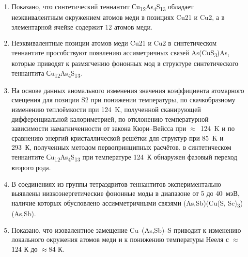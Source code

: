 \begin{enumerate}
\item Показано, что синтетический теннантит Сu\textsubscript{12}As\textsubscript{4}S\textsubscript{13} обладает неэквивалентным  окружением атомов меди в позициях Cu21 и Cu2, а в элементарной ячейке содержит 12 атомов меди.
\item Неэквивалентные позиции атомов меди Cu21 и Cu2 в синтетическом теннантите прособствуют появлению ассиметричных связей As(CuS\textsubscript{3})As, которые приводят к размягчению фононных мод в структуре синтетического теннантита Сu\textsubscript{12}As\textsubscript{4}S\textsubscript{13}.
\item На основе данных аномального изменения значения коэффициента атомарного смещения для позиции S2 при понижении температуры, по скачкобразному изменению теплоёмкости при 124~K, полученной сканирующей дифференциальной калориметрией, по отклонению температурной зависимости намагниченности от закона Кюри--Вейсса при $\approx$~124~K и по сравнению энергий кристаллической решётки для структур при 85~K и 293~К, полученных методом первопринципных расчётов, в синтетическом теннантите Сu\textsubscript{12}As\textsubscript{4}S\textsubscript{13} при температуре 124~К обнаружен фазовый переход второго рода.
\item В соединениях из группы тетраэдритов-теннантитов экспериментально выявлены низкоэнергетические фононные моды в диапазоне от 5 до 40~мэВ, наличие которых обусловлено  ассимметричными связями (As,Sb)(Cu(S, Se)\textsubscript{3})(As,Sb).
\item Показано, что изовалентное замещение Cu--(As,Sb)--S приводит к изменению локального окружения атомов меди и к понижению температуры Нееля с $\approx$124 К до $\approx$84 К.

\end{enumerate}

